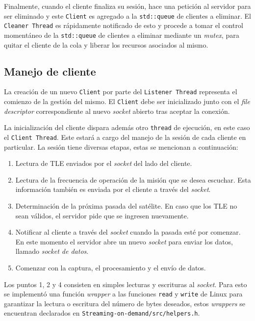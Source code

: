 \documentclass[../../main.tex]{subfiles}
\begin{document}
Finalmente, cuando el cliente finaliza su sesión, hace una petición al servidor para ser eliminado y este \texttt{Client} es agregado a la \texttt{std::queue} de clientes a eliminar. El \texttt{Cleaner Thread} es rápidamente notificado de esto y procede a tomar el control momentáneo de la \texttt{std::queue} de clientes a eliminar mediante un \textit{mutex}, para quitar el cliente de la cola y liberar los recursos asociados al mismo.



\subsection{Manejo de cliente}
La creación de un nuevo \texttt{Client} por parte del \texttt{Listener Thread} representa el comienzo de la gestión del mismo. El \texttt{Client} debe ser  inicializado junto con el \textit{file descriptor} correspondiente al nuevo \textit{socket} abierto tras aceptar la conexión. 

La inicialización del cliente dispara además otro \texttt{thread} de ejecución, en este caso el \texttt{Client Thread}. Este estará a cargo del manejo de la sesión de cada cliente en particular. La sesión tiene diversas etapas, estas se mencionan a continuación:
\begin{enumerate}
    \item Lectura de TLE enviados por el \textit{socket} del lado del cliente.
    \item Lectura de la frecuencia de operación de la misión que se desea escuchar. Esta información también es enviada por el cliente a través del \textit{socket}.
    \item Determinación de la próxima pasada del satélite. En caso que los TLE no sean válidos, el servidor pide que se ingresen nuevamente.
    \item Notificar al cliente a través del \textit{socket} cuando la pasada esté por comenzar. En este momento el servidor abre un nuevo \textit{socket} para enviar los datos, llamado \textit{socket de datos}.
    \item Comenzar con la captura, el procesamiento y el envío de datos.
\end{enumerate}

Los puntos 1, 2 y 4 consisten en simples lecturas y escrituras al \textit{socket}. Para esto se implementó una función \textit{wrapper} a las funciones \texttt{read} y \texttt{write} de Linux para garantizar la lectura o escritura del número de bytes deseados, estos \textit{wrappers} se encuentran declarados en \texttt{Streaming-on-demand/src/helpers.h}.
\end{document}
